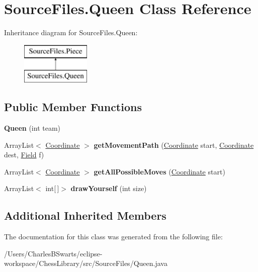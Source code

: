\hypertarget{class_source_files_1_1_queen}{}\section{Source\+Files.\+Queen Class Reference}
\label{class_source_files_1_1_queen}
Inheritance diagram for Source\+Files.\+Queen\+:\begin{figure}[H]
\begin{center}
\leavevmode
\includegraphics[height=2.000000cm]{class_source_files_1_1_queen}
\end{center}
\end{figure}
\subsection*{Public Member Functions}
\begin{DoxyCompactItemize}
\item 
\mbox{\label{class_source_files_1_1_queen_a280d919348ba83ae68d62dd34aef847f}} 
{\bfseries Queen} (int team)
\item 
\mbox{\label{class_source_files_1_1_queen_a02ae5841277d331c621d09ed4ce8ba29}} 
Array\+List$<$ \mbox{\hyperlink{class_source_files_1_1_coordinate}{Coordinate}} $>$ {\bfseries get\+Movement\+Path} (\mbox{\hyperlink{class_source_files_1_1_coordinate}{Coordinate}} start, \mbox{\hyperlink{class_source_files_1_1_coordinate}{Coordinate}} dest, \mbox{\hyperlink{class_source_files_1_1_field}{Field}} f)
\item 
\mbox{\label{class_source_files_1_1_queen_ab434d2d28cd6364dc87906377f19a62c}} 
Array\+List$<$ \mbox{\hyperlink{class_source_files_1_1_coordinate}{Coordinate}} $>$ {\bfseries get\+All\+Possible\+Moves} (\mbox{\hyperlink{class_source_files_1_1_coordinate}{Coordinate}} start)
\item 
\mbox{\label{class_source_files_1_1_queen_a0b7adc1b1037b63d0de7d70c87ee9f41}} 
Array\+List$<$ int\mbox{[}$\,$\mbox{]}$>$ {\bfseries draw\+Yourself} (int size)
\end{DoxyCompactItemize}
\subsection*{Additional Inherited Members}


The documentation for this class was generated from the following file\+:\begin{DoxyCompactItemize}
\item 
/\+Users/\+Charles\+B\+Swarts/eclipse-\/workspace/\+Chess\+Library/src/\+Source\+Files/Queen.\+java\end{DoxyCompactItemize}
